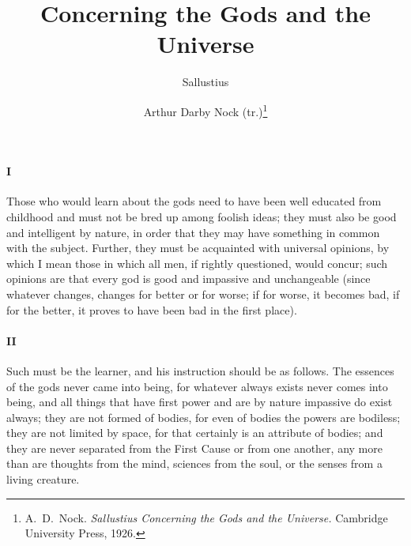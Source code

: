 \documentclass[12pt]{article}
\title{Concerning the Gods and the Universe}
\author{Sallustius \and Arthur Darby Nock (tr.)\footnote{A.~D.~Nock.
\textit{Sallustius Concerning the Gods and the Universe.} Cambridge University
Press, 1926.}}
\date{}
\begin{document}
\maketitle

\paragraph{I} Those who would learn about the gods need to have been well
educated from childhood and must not be bred up among foolish ideas; they must
also be good and intelligent by nature, in order that they may have something
in common with the subject. Further, they must be acquainted with universal
opinions, by which I mean those in which all men, if rightly questioned, would
concur; such opinions are that every god is good and impassive and unchangeable
(since whatever changes, changes for better or for worse; if for worse, it
becomes bad, if for the better, it proves to have been bad in the first place).

\paragraph{II} Such must be the learner, and his instruction should be as
follows. The essences of the gods never came into being, for whatever always
exists never comes into being, and all things that have first power and are by
nature impassive do exist always; they are not formed of bodies, for even of
bodies the powers are bodiless; they are not limited by space, for that
certainly is an attribute of bodies; and they are never separated from the
First Cause or from one another, any more than are thoughts from the mind,
sciences from the soul, or the senses from a living creature.
\end{document}
